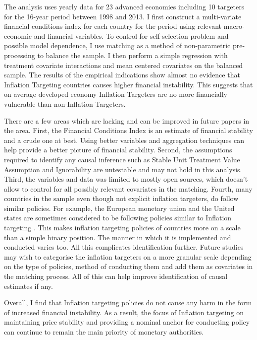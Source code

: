 \documentclass[12pt]{article}
\begin{document}
The analysis uses yearly data for 23 advanced economies including 10 targeters for the 16-year period between 1998 and 2013. I first construct a multi-variate financial conditions index for each country for the period using relevant macro-economic and financial variables. To control for self-selection problem and possible model dependence, I use matching as a method of non-parametric pre-processing to balance the sample. I then perform a simple regression with treatment covariate interactions and mean centered covariates on the balanced sample. The results of the empirical indications show almost no evidence that Inflation Targeting countries causes higher financial instability. This suggests that on average developed economy Inflation Targeters are no more financially vulnerable than non-Inflation Targeters. 

There are a few areas which are lacking and can be improved in future papers in the area. First, the Financial Conditions Index is an estimate of financial stability and a crude one at best. Using better variables and aggregation techniques can help provide a better picture of financial stability. Second, the assumptions required to identify any causal inference such as Stable Unit Treatment Value Assumption and Ignorability are untestable and may not hold in this analysis. Third, the variables and data was limited to mostly open sources, which doesn't allow to control for all possibly relevant covariates in the matching. Fourth, many countries in the sample even though not explicit inflation targeters, do follow similar policies. For example, the European monetary union and the United states are sometimes considered to be following policies similar to Inflation targeting \citep{RN9}.  This makes inflation targeting policies of countries more on a scale than a simple binary position. The manner in which it is implemented and conducted varies too. All this complicates identification further. Future studies may wish to categorise the inflation targeters on a more granular scale depending on the type of policies, method of conducting them and add them as covariates in the matching process. All of this can help improve identification of causal estimates if any.

Overall, I find that Inflation targeting policies do not cause any harm in the form of increased financial instability. As a result, the focus of Inflation targeting on maintaining price stability and providing a nominal anchor for conducting policy can continue to remain the main priority of monetary authorities.
\end{document}
